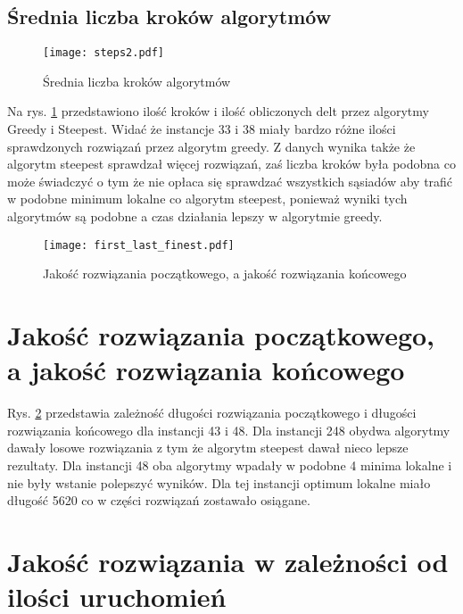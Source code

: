 \documentclass{article}
\begin{document}
\subsection{Średnia liczba kroków algorytmów}

\begin{figure} 
\begin{center}
    \texttt{[image: steps2.pdf]}
\end{center}
\caption{Średnia liczba kroków algorytmów}
\label{fig:plot_steps}
\end{figure}

Na rys. \ref{fig:plot_steps} przedstawiono ilość kroków i ilość obliczonych delt przez algorytmy Greedy i Steepest. Widać że instancje 33 i 38 miały bardzo różne ilości sprawdzonych rozwiązań przez algorytm greedy. Z danych wynika także że algorytm steepest sprawdzał więcej rozwiązań, zaś liczba kroków była podobna co może świadczyć o tym że nie opłaca się sprawdzać wszystkich sąsiadów aby trafić w podobne minimum lokalne co algorytm steepest, ponieważ wyniki tych algorytmów są podobne a czas działania lepszy w algorytmie greedy.




\begin{figure}[H]
    \begin{center}
        \texttt{[image: first\_last\_finest.pdf]}
    \end{center}
    \caption{Jakość rozwiązania początkowego, a jakość rozwiązania końcowego}
    \label{fig:first_finnest}
\end{figure}


\section{Jakość rozwiązania początkowego, a jakość rozwiązania końcowego}

Rys. \ref{fig:first_finnest} przedstawia zależność długości rozwiązania początkowego i długości rozwiązania końcowego dla instancji 43 i 48. Dla instancji 248 obydwa algorytmy dawały losowe rozwiązania z tym że algorytm steepest dawał nieco lepsze rezultaty. Dla instancji 48 oba algorytmy wpadały w podobne 4 minima lokalne i nie były wstanie polepszyć wyników. Dla tej instancji optimum lokalne miało długość 5620 co w części rozwiązań zostawało osiągane.

\section{Jakość rozwiązania w zależności od ilości uruchomień}
\end{document}
